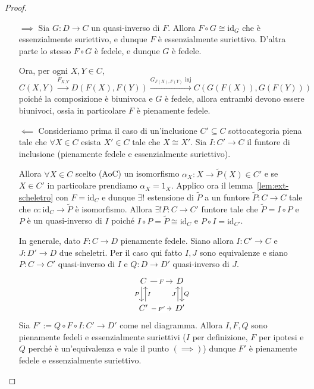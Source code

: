 \documentclass[notitlepage]{report}
\numberwithin{equation}{section}
\theoremstyle{plain}
\theoremstyle{definition}
\theoremstyle{remark}
\begin{document}
\begin{proof}\( \)
\begin{itemize}
    \item[\(\implies \)] Sia \(G : D \to C\) un quasi-inverso di \(F\). Allora
        \(F \circ G \cong \mathrm{id}_G\) che è essenzialmente suriettivo, e
        dunque \(F\) è essenzialmente suriettivo. D'altra parte lo stesso \(F
        \circ G\) è fedele, e dunque \(G\) è fedele.
        
        Ora, per ogni \(X, Y \in C\),
        \[
          C{(X, Y)} \overset{F_{X,Y} }{\to } D{(F{(X)}, F{(Y)})} \overset{G_{F{(X)}, F{(Y)}}  \text{ inj}}{\to} C{(G{(F{(X)})}, G{(F{(Y)})})}
        \]
        poiché la composizione è biunivoca e \(G\) è fedele, allora entrambi
        devono essere biunivoci, ossia in particolare \(F\) è pienamente fedele.
    \item[\(\impliedby \)] Consideriamo prima il caso di un'inclusione \(C' \subseteq C \) sottocategoria piena tale che \(\forall X \in C\) esista \(X' \in C\) tale che \(X \cong X'\). 
        Sia \(I : C' \to C\) il funtore di inclusione (pienamente fedele e
        essenzialmente suriettivo).

        Allora \(\forall X \in C\) scelto (AoC) un
        isomorfismo \(\alpha_X : X \to \tilde{P}{(X)} \in C'\) e se \(X \in 
        C'\) in particolare prendiamo \(\alpha_X = 1_X\). Applico ora il
        lemma~\ref{lem:ext-scheletro} con \(F = \mathrm{id}_C\) e dunque \(\exists !\) estensione di \(\tilde{P}\) a un funtore \(\tilde{P} : C \to C\) tale che \(\alpha : \mathrm{id}_C \to \tilde{P}\) è isomorfismo. Allora \(\exists ! P : C \to C'\) funtore tale che \(\tilde{P} = I \circ P\) e \(P\) è un quasi-inverso di \(I\) poiché \(I \circ P = \tilde{P} \cong \mathrm{id}_C\) e \(P \circ I = \mathrm{id}_{C'}\).

        In generale, dato \(F : C \to D\) pienamente fedele. Siano allora \(
        I : C' \to C\) e \(J : D' \to D\) due scheletri. Per il caso qui fatto
        \(I, J\) sono equivalenze e siano \(P : C\to C'\) quasi-inverso di \(I\) e \(Q : D \to D'\) quasi-inverso di \(J\).
\[\begin{tikzcd}
	C & D \\
	{C'} & {D'}
	\arrow["F"{description}, from=1-1, to=1-2]
	\arrow["P"', shift right, from=1-1, to=2-1]
	\arrow["Q", shift left, from=1-2, to=2-2]
	\arrow["I"', shift right, from=2-1, to=1-1]
	\arrow["{F'}"{description}, from=2-1, to=2-2]
	\arrow["J", shift left, from=2-2, to=1-2]
\end{tikzcd}\]
    Sia \(F' := Q \circ F \circ I : C' \to D'\) come nel diagramma. Allora \(
    I, F, Q\) sono pienamente fedeli e essenzialmente suriettivi (\(I\) per
    definizione, \(F\) per ipotesi e \(Q\) perché è un'equivalenza e vale il
    punto \({(\implies )}\)) dunque \(
    F'\) è pienamente fedele e essenzialmente suriettivo.


\end{itemize}
\end{proof}
\end{document}
